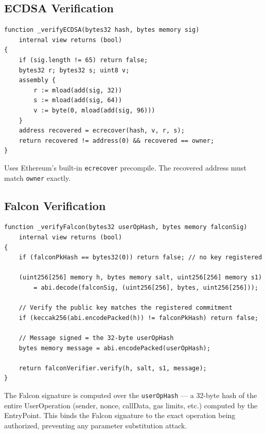 \documentclass[11pt,a4paper]{article}
\begin{document}
\subsection{ECDSA Verification}

\begin{lstlisting}[style=solidity, caption={\_verifyECDSA}]
function _verifyECDSA(bytes32 hash, bytes memory sig)
    internal view returns (bool)
{
    if (sig.length != 65) return false;
    bytes32 r; bytes32 s; uint8 v;
    assembly {
        r := mload(add(sig, 32))
        s := mload(add(sig, 64))
        v := byte(0, mload(add(sig, 96)))
    }
    address recovered = ecrecover(hash, v, r, s);
    return recovered != address(0) && recovered == owner;
}
\end{lstlisting}

Uses Ethereum's built-in \texttt{ecrecover} precompile. The recovered address must match
\texttt{owner} exactly.

\subsection{Falcon Verification}

\begin{lstlisting}[style=solidity, caption={\_verifyFalcon}]
function _verifyFalcon(bytes32 userOpHash, bytes memory falconSig)
    internal view returns (bool)
{
    if (falconPkHash == bytes32(0)) return false; // no key registered

    (uint256[256] memory h, bytes memory salt, uint256[256] memory s1)
        = abi.decode(falconSig, (uint256[256], bytes, uint256[256]));

    // Verify the public key matches the registered commitment
    if (keccak256(abi.encodePacked(h)) != falconPkHash) return false;

    // Message signed = the 32-byte userOpHash
    bytes memory message = abi.encodePacked(userOpHash);

    return falconVerifier.verify(h, salt, s1, message);
}
\end{lstlisting}

\begin{infobox}
The Falcon signature is computed over the \texttt{userOpHash} --- a 32-byte hash of the
entire UserOperation (sender, nonce, callData, gas limits, etc.) computed by the EntryPoint.
This binds the Falcon signature to the exact operation being authorized, preventing any
parameter substitution attack.
\end{infobox}
\end{document}
